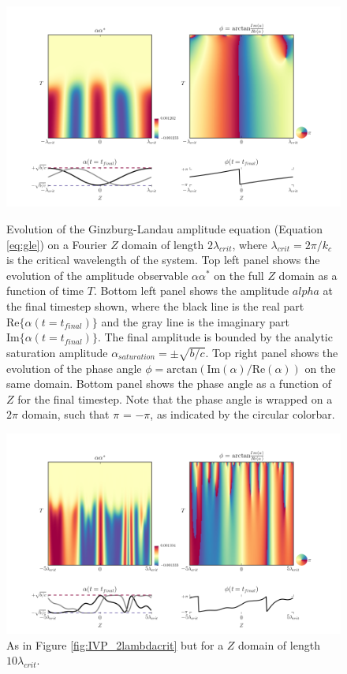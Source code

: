 \documentclass{emulateapj}
\begin{document}
\begin{figure}[h!]
\centering
\includegraphics[width=\textwidth]{../figures/IVP_plot_thingap_AA_phase_2lambdacrit_2.png}%
\caption{Evolution of the Ginzburg-Landau amplitude equation (Equation \ref{eq:gle}) on a Fourier $Z$ domain of length $2 \lambda_{crit}$, where $\lambda_{crit} = 2\pi/k_c$ is the critical wavelength of the system. Top left panel shows the evolution of the amplitude observable $\alpha \alpha^*$ on the full $Z$ domain as a function of time $T$. Bottom left panel shows the amplitude $alpha$ at the final timestep shown, where the black line is the real part $\mathrm{Re}\{\alpha(t = t_{final})\}$ and the gray line is the imaginary part $\mathrm{Im}\{\alpha(t = t_{final})\}$. The final amplitude is bounded by the analytic saturation amplitude $\alpha_{saturation} = \pm \sqrt{b/c}$. Top right panel shows the evolution of the phase angle $\phi = \mathrm{arctan} (\mathrm{Im}(\alpha)/\mathrm{Re}(\alpha))$ on the same domain. Bottom panel shows the phase angle as a function of $Z$ for the final timestep. Note that the phase angle is wrapped on a $2\pi$ domain, such that $\pi$ = $-\pi$, as indicated by the circular colorbar.}\label{fig:IVP_2lambdacrit}

\centering
\includegraphics[width=\textwidth]{../figures/IVP_plot_thingap_AA_phase_2lambdacrit_10.png}%
\caption{As in Figure \ref{fig:IVP_2lambdacrit} but for a $Z$ domain of length $10 \lambda_{crit}$.}\label{fig:IVP_10lambdacrit}
\end{figure}
\end{document}
